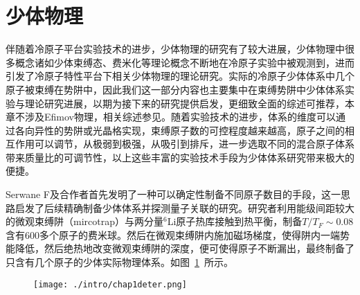\section{少体物理}\label{1sec:fewbody}
伴随着冷原子平台实验技术的进步，少体物理的研究有了较大进展，少体物理中很多概念诸如少体束缚态、费米化等理论概念不断地在冷原子实验中被观测到，进而引发了冷原子特性平台下相关少体物理的理论研究。实际的冷原子少体体系中几个原子被束缚在势阱中，因此我们这一部分内容也主要集中在束缚势阱中少体体系实验与理论研究进展，以期为接下来的研究提供启发，更细致全面的综述可推荐\cite{sowinski2019one,blume2012few}，本章不涉及Efimov物理，相关综述参见\cite{nielsen2001three,braaten2006universality,KohlerMolFRRMP}。随着实验技术的进步，体系的维度可以通过各向异性的势阱或光晶格实现，束缚原子数的可控程度越来越高，原子之间的相互作用可以调节，从极弱到极强，从吸引到排斥，进一步选取不同的混合原子体系带来质量比的可调节性，以上这些丰富的实验技术手段为少体体系研究带来极大的便捷。
\begin{comment}
实验中最早制备出费米子少体体系可以追溯到2005年，在较深的光晶格体系中,进入到莫特绝缘体区域，制备少体体系\cite{greiner2002quantum,EsslingerFermiSea,Esslinger1DMol,Esslinger3DMol,Ospelkaus3DMol,Hecker3DMol,SalaCIRMol}。如图~\ref{3dmol}~所示，
\begin{figure}[!htbp]
    \centering
    \texttt{[image: chap13dmol.png]}
    \bicaption{三维光晶格中的Feshbach分子态。散点代表不同晶格深度的实验数据。实线代表理论数据。摘自 \citep{Esslinger3DMol}}{The measured binding energy of molecules in a 3D optical lattice. Scatterd points for defferent depth of latice. The solid line for theory. Reprinted from \citep{Esslinger3DMol}}
    \label{3dmol}
\end{figure}
实验观测到了较深光晶格内调节磁场形成的Feshbach分子态。
\end{comment}

Serwane F及合作者首先发明了一种可以确定性制备不同原子数目的手段\cite{SerwaneDeterministic}，这一思路启发了后续精确制备少体体系并探测量子关联的研究\cite{zurn2012fermionization,WenzFermiSeaOnebyOne,Zurn2013Pairing,MurmannSpinChain,MurmannTwoFermionDoubleWell,RontaniTunneling}。研究者利用能级间距较大的微观束缚阱（mircotrap）与两分量${}^6$Li原子热库接触到热平衡，制备$T/T_F\sim0.08$含有600多个原子的费米球。然后在微观束缚阱内施加磁场梯度，使得阱内一端势能降低，然后绝热地改变微观束缚阱的深度，便可使得原子不断漏出，最终制备了只含有几个原子的少体实际物理体系。如图~\ref{deter}~所示。
\begin{figure}[!htbp]
    \centering
    \texttt{[image: ./intro/chap1deter.png]}
    \label{deter}
\end{figure}

